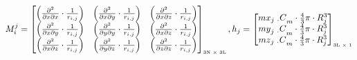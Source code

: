 \begin{equation} \label{eq:sphere4}
\small M_i^j =\left[\begin{matrix}\left(\frac{\partial^2}{\partial x\partial x}\cdot\frac{1}{r_{i,j}}\right)&\left(\frac{\partial^2}{\partial x\partial y}\cdot\frac{1}{r_{i,j}}\right)&\left(\frac{\partial^2}{\partial x\partial z}\cdot\frac{1}{r_{i,j}}\right)\\\left(\frac{\partial^2}{\partial x\partial y}\cdot\frac{1}{r_{i,j}}\right)&\left(\frac{\partial^2}{\partial y\partial y}\cdot\frac{1}{r_{i,j}}\right)&\left(\frac{\partial^2}{\partial x\partial z}\cdot\frac{1}{r_{i,j}}\right)\\\left(\frac{\partial^2}{\partial x\partial z}\cdot\frac{1}{r_{i,j}}\right)&\left(\frac{\partial^2}{\partial y\partial z}\cdot\frac{1}{r_{i,j}}\right)&\left(\frac{\partial^2}{\partial z\partial z}\cdot\frac{1}{r_{i,j}}\right)\\\end{matrix}\right]_{\text{\tiny 3N $\times$ 3L}},
h_j =\left[\begin{matrix}{{mx}_{j\ \cdot}C}_m \cdot \frac{4}{3}\pi\cdot R_j^3\\{{my}_{j\ \cdot}C}_m \cdot \frac{4}{3}\pi\cdot R_j^3\\{{mz}_{j\ \cdot}C}_m \cdot \frac{4}{3}\pi\cdot R_j^3\\\end{matrix}\right]_{\text{\tiny 3L $\times$ 1}}
\end{equation}

\begin{FlushRight}
\end{FlushRight}


